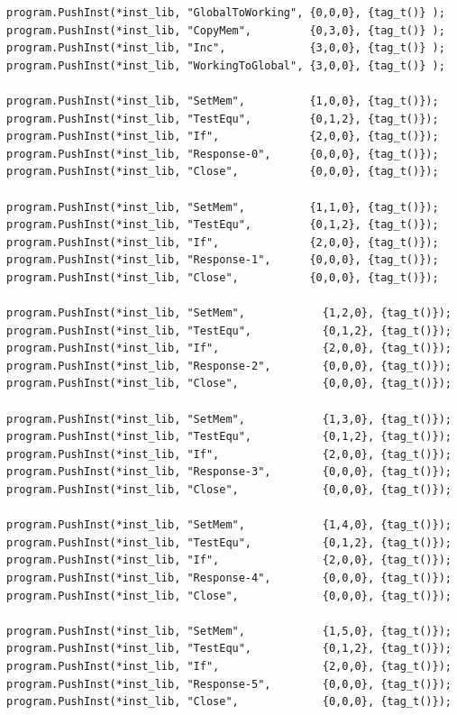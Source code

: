 \documentclass[
]{book}
\begin{document}
\begin{verbatim}
program.PushInst(*inst_lib, "GlobalToWorking", {0,0,0}, {tag_t()} );
program.PushInst(*inst_lib, "CopyMem",         {0,3,0}, {tag_t()} );
program.PushInst(*inst_lib, "Inc",             {3,0,0}, {tag_t()} );
program.PushInst(*inst_lib, "WorkingToGlobal", {3,0,0}, {tag_t()} );

program.PushInst(*inst_lib, "SetMem",          {1,0,0}, {tag_t()});
program.PushInst(*inst_lib, "TestEqu",         {0,1,2}, {tag_t()});
program.PushInst(*inst_lib, "If",              {2,0,0}, {tag_t()});
program.PushInst(*inst_lib, "Response-0",      {0,0,0}, {tag_t()});
program.PushInst(*inst_lib, "Close",           {0,0,0}, {tag_t()});

program.PushInst(*inst_lib, "SetMem",          {1,1,0}, {tag_t()});
program.PushInst(*inst_lib, "TestEqu",         {0,1,2}, {tag_t()});
program.PushInst(*inst_lib, "If",              {2,0,0}, {tag_t()});
program.PushInst(*inst_lib, "Response-1",      {0,0,0}, {tag_t()});
program.PushInst(*inst_lib, "Close",           {0,0,0}, {tag_t()});

program.PushInst(*inst_lib, "SetMem",            {1,2,0}, {tag_t()});
program.PushInst(*inst_lib, "TestEqu",           {0,1,2}, {tag_t()});
program.PushInst(*inst_lib, "If",                {2,0,0}, {tag_t()});
program.PushInst(*inst_lib, "Response-2",        {0,0,0}, {tag_t()});
program.PushInst(*inst_lib, "Close",             {0,0,0}, {tag_t()});

program.PushInst(*inst_lib, "SetMem",            {1,3,0}, {tag_t()});
program.PushInst(*inst_lib, "TestEqu",           {0,1,2}, {tag_t()});
program.PushInst(*inst_lib, "If",                {2,0,0}, {tag_t()});
program.PushInst(*inst_lib, "Response-3",        {0,0,0}, {tag_t()});
program.PushInst(*inst_lib, "Close",             {0,0,0}, {tag_t()});

program.PushInst(*inst_lib, "SetMem",            {1,4,0}, {tag_t()});
program.PushInst(*inst_lib, "TestEqu",           {0,1,2}, {tag_t()});
program.PushInst(*inst_lib, "If",                {2,0,0}, {tag_t()});
program.PushInst(*inst_lib, "Response-4",        {0,0,0}, {tag_t()});
program.PushInst(*inst_lib, "Close",             {0,0,0}, {tag_t()});

program.PushInst(*inst_lib, "SetMem",            {1,5,0}, {tag_t()});
program.PushInst(*inst_lib, "TestEqu",           {0,1,2}, {tag_t()});
program.PushInst(*inst_lib, "If",                {2,0,0}, {tag_t()});
program.PushInst(*inst_lib, "Response-5",        {0,0,0}, {tag_t()});
program.PushInst(*inst_lib, "Close",             {0,0,0}, {tag_t()});


\end{verbatim}
\end{document}
